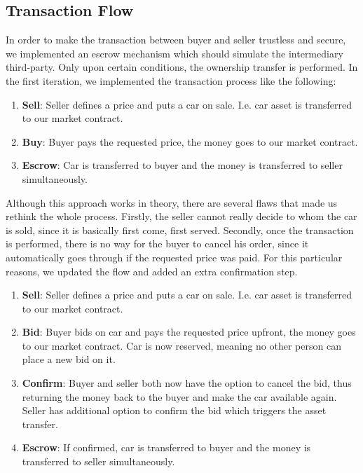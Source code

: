 \subsection{Transaction Flow}
In order to make the transaction between buyer and seller trustless and secure, we implemented an escrow mechanism which should simulate the intermediary third-party. Only upon certain conditions, the ownership transfer is performed. In the first iteration, we implemented the transaction process like the following:
\begin{enumerate}
  \item \textbf{Sell}: Seller defines a price and puts a car on sale. I.e. car asset is transferred to our market contract.
  \item \textbf{Buy}: Buyer pays the requested price, the money goes to our market contract.
  \item \textbf{Escrow}: Car is transferred to buyer and the money is transferred to seller simultaneously.
\end{enumerate}

Although this approach works in theory, there are several flaws that made us rethink the whole process. Firstly, the seller cannot really decide to whom the car is sold, since it is basically first come, first served. Secondly, once the transaction is performed, there is no way for the buyer to cancel his order, since it automatically goes through if the requested price was paid. For this particular reasons, we updated the flow and added an extra confirmation step.

\begin{enumerate}
    \item \textbf{Sell}: Seller defines a price and puts a car on sale. I.e. car asset is transferred to our market contract.
    \item \textbf{Bid}: Buyer bids on car and pays the requested price upfront, the money goes to our market contract. Car is now reserved, meaning no other person can place a new bid on it.
    \item \textbf{Confirm}: Buyer and seller both now have the option to cancel the bid, thus returning the money back to the buyer and make the car available again. Seller has additional option to confirm the bid which triggers the asset transfer.
    \item \textbf{Escrow}: If confirmed, car is transferred to buyer and the money is transferred to seller simultaneously.
  \end{enumerate}

